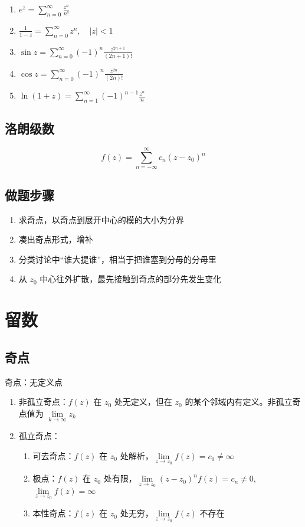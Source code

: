 \documentclass{article}
\begin{document}
\begin{enumerate}
    \item $e^z = \sum_{n=0}^{\infty} \frac{z^n}{n!}$
    \item $\frac{1}{1-z} = \sum_{n=0}^{\infty} z^n, \quad \left\lvert z \right\rvert < 1$
    \item $\sin z = \sum_{n=0}^{\infty} (-1)^n \frac{ z^{2n+1}}{(2n+1)!}$
    \item $\cos z = \sum_{n=0}^{\infty} (-1)^n \frac{ z^{2n}}{(2n)!}$
    \item $\ln(1+z) = \sum_{n=1}^{\infty} (-1)^{n-1} \frac{ z^n}{n}$
\end{enumerate}

\subsection{洛朗级数}

\begin{equation}
    f(z) = \sum_{n=-\infty}^{\infty} c_n (z-z_0)^n
\end{equation}

\subsection{做题步骤}

\begin{enumerate}
    \item 求奇点，以奇点到展开中心的模的大小为分界
    \item 凑出奇点形式，增补
    \item 分类讨论中“谁大提谁”，相当于把谁塞到分母的分母里
    \item 从 $z_0$ 中心往外扩散，最先接触到奇点的部分先发生变化
\end{enumerate}

\section{留数}

\subsection{奇点}

奇点：无定义点
\begin{enumerate}
    \item 非孤立奇点：$f(z)$ 在 $z_0$ 处无定义，但在 $z_0$ 的某个邻域内有定义。非孤立奇点值为 $\lim\limits_{k \to \infty} z_k$
    \item 孤立奇点：
    \begin{enumerate}
        \item 可去奇点：$f(z)$ 在 $z_0$ 处解析，$\lim\limits_{z \to z_0} f(z)=c_0 \neq \infty$ 
        \item 极点：$f(z)$ 在 $z_0$ 处有限，$\lim\limits_{z \to z_0} (z-z_0)^n f(z)=c_n \neq 0$, $\lim\limits_{z \to z_0} f(z)=\infty$
        \item 本性奇点：$f(z)$ 在 $z_0$ 处无穷，$\lim\limits_{z \to z_0} f(z)$ 不存在
    \end{enumerate}
\end{enumerate}
\end{document}
